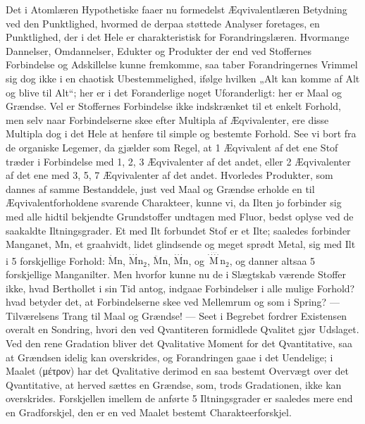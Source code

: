 \documentclass[12pt,a4paper]{book}
\begin{document}
Det i Atomlæren Hypothetiske faaer nu formedelst Æqvivalentlæren
Betydning ved den Punktlighed, hvormed de derpaa
støttede Analyser foretages, en Punktlighed, der i det
Hele er charakteristisk for Forandringslæren. Hvormange
Dannelser, Omdannelser, Edukter og Produkter der end ved
Stoffernes Forbindelse og Adskillelse kunne fremkomme, saa
taber Forandringernes Vrimmel sig dog ikke i en chaotisk
Ubestemmelighed, ifølge hvilken „Alt kan komme af Alt og
blive til Alt“; her er i det Foranderlige noget Uforanderligt:
her er Maal og Grændse. Vel er Stoffernes Forbindelse
ikke indskrænket til et enkelt Forhold, men selv naar Forbindelserne
skee efter Multipla af Æqvivalenter, ere disse
Multipla dog i det Hele at henføre til simple og bestemte
Forhold. See vi bort fra de organiske Legemer, da gjælder
som Regel, at 1 Æqvivalent af det ene Stof træder i Forbindelse
med 1, 2, 3 Æqvivalenter af det andet, eller 2
Æqvivalenter af det ene med 3, 5, 7 Æqvivalenter af det
andet. Hvorledes Produkter, som dannes af samme Bestanddele,
just ved Maal og Grændse erholde en til Æqvivalentforholdene
svarende Charakteer, kunne vi, da Ilten jo
\setcounter{footnote}{0}
forbinder sig med alle hidtil bekjendte Grundstoffer undtagen
med Fluor, bedst oplyse ved de saakaldte Iltningsgrader. Et
med Ilt forbundet Stof er et Ilte; saaledes forbinder
Manganet, $\mathrm{Mn}$, et graahvidt, lidet glindsende og meget
sprødt Metal, sig med Ilt i 5 forskjellige Forhold:
$\dot{\mathrm{M}}\mathrm{n}$,
$\stackrel{\cdot\cdot\cdot}{\mathrm{M}}\mathrm{n}_2$,
$\ddot{\mathrm{M}}\mathrm{n}$,
$\stackrel{\cdot\cdot\cdot}{\mathrm{M}}\mathrm{n}$, og
$\stackrel{\stackrel{\cdot\cdot\cdot}{\cdot\cdot\cdot\cdot}}{\mathrm{M}}\mathrm{n}_2$,
og danner altsaa 5 forskjellige Manganilter.
Men hvorfor kunne nu de i Slægtskab værende Stoffer
ikke, hvad Berthollet i sin Tid antog, indgaae Forbindelser i
alle mulige Forhold? hvad betyder det, at Forbindelserne skee
ved Mellemrum og som i Spring? --- Tilværelsens Trang til
Maal og Grændse! --- Seet i Begrebet fordrer Existensen
overalt en Sondring, hvori den ved Qvantiteren formidlede
Qvalitet gjør Udslaget. Ved den rene Gradation bliver det
Qvalitative Moment for det Qvantitative, saa at Grændsen
idelig kan overskrides, og Forandringen gaae i det Uendelige;
i Maalet (μέτρον) har det Qvalitative derimod en saa bestemt
Overvægt over det Qvantitative, at herved sættes en
Grændse, som, trods Gradationen, ikke kan overskrides. Forskjellen
imellem de anførte 5 Iltningsgrader er saaledes mere
end en Gradforskjel, den er en ved Maalet bestemt Charakteerforskjel.
\end{document}
